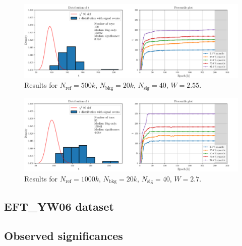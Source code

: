 \vspace{-5mm}
\begin{figure}[H]
	\centering
	\includegraphics[width=1.0\textwidth]{Python/RESULTS/ref500000_bkg20000_sig40/data_ref500000_bkg20000_sig40_wclip2-55.pdf}
	\caption{Results for $N_\mathrm{ref}=500\si{k}$, $N_\mathrm{bkg}=20\si{k}$, $N_\mathrm{sig}=40$, $W=2.55$.}
	\label{fig:REF500000_BKG20000_SIG40_WCLIP2.55}
\end{figure}
\vspace{-5mm}
\begin{figure}[H]
	\centering
	\includegraphics[width=1.0\textwidth]{Python/RESULTS/ref1000000_bkg20000_sig40/data_ref1000000_bkg20000_sig40_wclip2-7.pdf}
	\caption{Results for $N_\mathrm{ref}=1000\si{k}$, $N_\mathrm{bkg}=20\si{k}$, $N_\mathrm{sig}=40$, $W=2.7$.}
	\label{fig:REF1000000_BKG20000_SIG40_WCLIP2.7}
\end{figure}





\subsection*{EFT\_YW06 dataset}





\subsection*{Observed significances}

